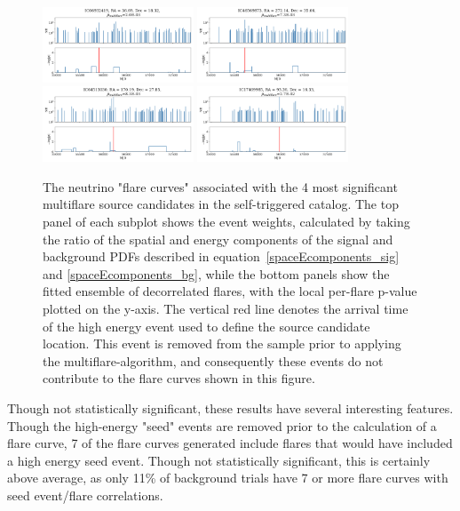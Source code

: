 \begin{figure}[h]
\centering
\includegraphics[width=0.4\textwidth]{figs/66932419.png}
\includegraphics[width=0.4\textwidth]{figs/46569873.png}
\includegraphics[width=0.4\textwidth]{figs/64513030.png}
\includegraphics[width=0.4\textwidth]{figs/17469985.png}
\caption{The neutrino "flare curves" associated with the 4 most significant multiflare source candidates in the self-triggered catalog. The top panel of each subplot shows the event weights, calculated by taking the ratio of the spatial and energy components of the signal and background PDFs described in equation~\ref{spaceEcomponents_sig} and \ref{spaceEcomponents_bg}, while the bottom panels show the fitted ensemble of decorrelated flares, with the local per-flare p-value plotted on the y-axis. The vertical red line denotes the arrival time of the high energy event used to define the source candidate location. This event is removed from the sample prior to applying the multiflare-algorithm, and consequently these events do not contribute to the flare curves shown in this figure.}
\label{fig:stresults}
\end{figure}


Though not statistically significant, these results have several interesting features. Though the high-energy "seed" events are removed prior to the calculation of a flare curve, 7 of the flare curves generated include flares that would have included a high energy seed event. Though not statistically significant, this is certainly above average, as only 11\% of background trials have 7 or more flare curves with seed event/flare correlations. 


